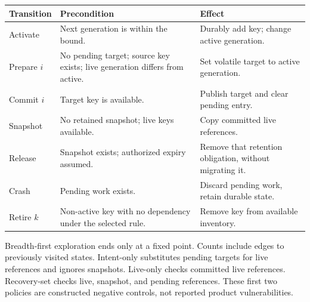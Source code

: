 \documentclass[10pt]{article}
\begin{document}
\begin{center}\begin{tabular}{@{}p{2.4cm}p{6.1cm}p{7cm}@{}}
\toprule
Transition & Precondition & Effect\\
\midrule
Activate & Next generation is within the bound. & Durably add key; change active generation.\\
Prepare $i$ & No pending target; source key exists; live generation differs from active. & Set volatile target to active generation.\\
Commit $i$ & Target key is available. & Publish target and clear pending entry.\\
Snapshot & No retained snapshot; live keys available. & Copy committed live references.\\
Release & Snapshot exists; authorized expiry assumed. & Remove that retention obligation, without migrating it.\\
Crash & Pending work exists. & Discard pending work, retain durable state.\\
Retire $k$ & Non-active key with no dependency under the selected rule. & Remove key from available inventory.\\
\bottomrule
\end{tabular}\end{center}
Breadth-first exploration ends only at a fixed point. Counts include edges to
previously visited states. Intent-only substitutes pending targets for live
references and ignores snapshots. Live-only checks committed live references.
Recovery-set checks live, snapshot, and pending references. These first two
policies are constructed negative controls, not reported product vulnerabilities.
\end{document}
